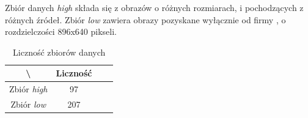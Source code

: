 Zbiór danych \textit{high} składa się z obrazów o różnych rozmiarach, i pochodzących z różnych źródeł.
Zbiór \textit{low} zawiera obrazy pozyskane wyłącznie od firmy \blue, o rozdzielczości 896x640 pikseli.

\begin{table}[!h]
	\centering
	\caption{Liczność zbiorów danych}
	\vspace{6pt}
	{\footnotesize
		\begin{tabular}{|c|c|c|c|}
			\hline \textbackslash & Liczność \\
      \hline Zbiór \textit{high} & 97 \\
      \hline Zbiór \textit{low} & 207 \\
      \hline
		\end{tabular}
	}
	\vspace{0pt}
\end{table}

